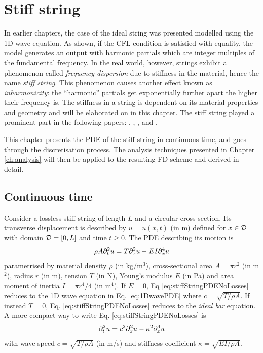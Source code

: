 \chapter{Stiff string}\label{ch:stiffString}
In earlier chapters, the case of the ideal string was presented modelled using the 1D wave equation. As shown, if the CFL condition is satisfied with equality, the model generates an output with harmonic partials which are integer multiples of the fundamental frequency. In the real world, however, strings exhibit a phenomenon called \textit{frequency dispersion} due to stiffness in the material, hence the name \textit{stiff string}. This phenomenon causes another effect known as \textit{inharmonicity}: the ``harmonic'' partials get exponentially further apart the higher their frequency is. The stiffness in a string is dependent on its material properties and geometry and will be elaborated on in this chapter. The stiff string played a prominent part in the following papers: \citeP[A], \citeP[B], \citeP[C], \citeP[D] and \citeP[E].

This chapter presents the PDE of the stiff string in continuous time, and goes through the discretisation process. The analysis techniques presented in Chapter \ref{ch:analysis} will then be applied to the resulting FD scheme and derived in detail. 

\section{Continuous time}
Consider a lossless stiff string of length $L$ and a circular cross-section. Its transverse displacement is described by $u=u(x,t)$ (in m) defined for $x\in \mathcal{D}$ with domain $\mathcal{D} = [0, L]$ and time $t\geq 0$. The PDE describing its motion is 
\begin{equation}\label{eq:stiffStringPDENoLosses}
    \rho A \partial_t^2 u = T \partial_x^2 u - EI \partial_x^4 u
\end{equation}
parametrised by material density $\rho$ (in kg/m$^3$), cross-sectional area $A = \pi r^2$ (in m$^2$), radius $r$ (in m), tension $T$ (in N), Young's modulus $E$ (in Pa) and area moment of inertia $I = \pi r^4/4$ (in m$^4$). If $E = 0$, Eq \eqref{eq:stiffStringPDENoLosses} reduces to the 1D wave equation in Eq. \eqref{eq:1DwavePDE} where $c = \sqrt{T/\rho A}$. If instead $T = 0$, Eq. \eqref{eq:stiffStringPDENoLosses} reduces to the \textit{ideal bar} equation. A more compact way to write Eq. \eqref{eq:stiffStringPDENoLosses} is 
\begin{equation}
    \partial_t^2 u = c^2 \partial_x^2 u - \kappa^2 \partial_x^4 u
\end{equation}
with wave speed $c = \sqrt{T/\rho A}$ (in m/s) and stiffness coefficient $\kappa = \sqrt{EI / \rho A}$. 

